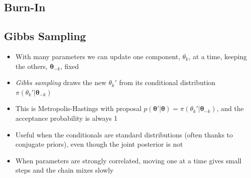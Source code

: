 
\begin{slide}
\section[-2]{Burn-In}
\pb
\pause
{}
\begin{center}
  \pause
\end{center}
\end{slide}


\begin{slide}
\section[-1]{Gibbs Sampling}

\begin{PauseHighLight}
  \begin{itemize}
  \item With many parameters we can update one component, $\theta_k$,
    at a time, keeping the others, $\bm{\theta}_{-k}$, fixed\pause
  \item \emph{Gibbs sampling} draws the new $\theta_k'$ from its
    conditional distribution $\pi(\theta_k'|\bm{\theta}_{-k})$\pause
  \item This is Metropolis-Hastings with proposal
    $p(\bm{\theta}'|\bm{\theta}) = \pi(\theta_k'|\bm{\theta}_{-k})$, and
    the acceptance probability is always 1\pause
  \item Useful when the conditionals are standard distributions (often
    thanks to conjugate priors), even though the joint posterior is
    not\pause
  \item When parameters are strongly correlated, moving one at a time
    gives small steps and the chain mixes slowly\pause
  \end{itemize}
\end{PauseHighLight}

\end{slide}


